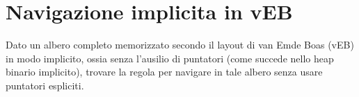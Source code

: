 \chapter{Navigazione implicita in vEB}

\begin{problem*}
    Dato un albero completo memorizzato secondo il layout di van Emde Boas (vEB) in
    modo implicito, ossia senza l'ausilio di puntatori (come succede nello heap binario
    implicito), trovare la regola per navigare in tale albero senza usare puntatori
    espliciti.
\end{problem*}

